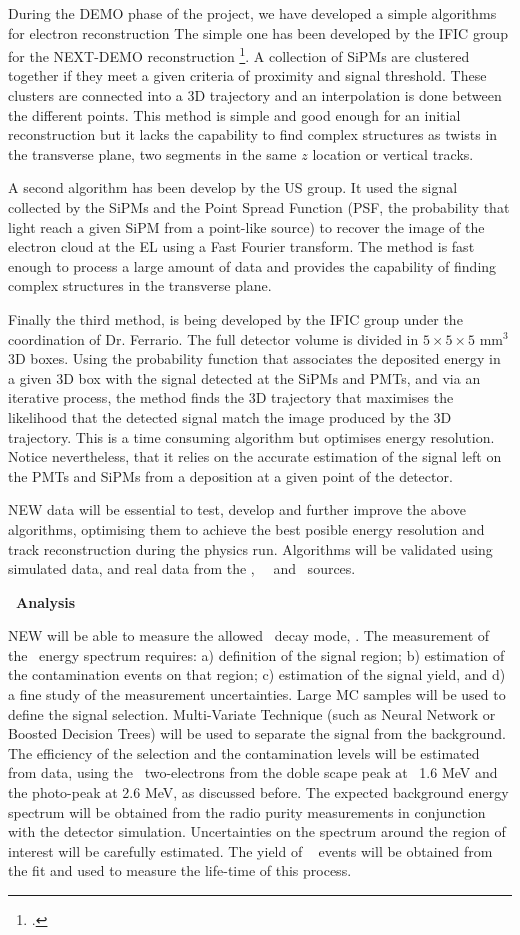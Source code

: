 During the DEMO phase of the project, we have developed a simple algorithms for electron reconstruction 
The simple one has been developed by the IFIC group for the NEXT-DEMO reconstruction \footcite{Alvarez:2012nd}. A collection of SiPMs are clustered together if they meet a given criteria of proximity and signal threshold. These clusters are connected into a 3D trajectory and an interpolation is done between the different points. This method is simple and good enough for an initial reconstruction but it lacks the capability to find complex structures as twists in the transverse plane, two segments in the same $z$ location or vertical tracks.
 
A second algorithm has been develop by the US group. It used the signal collected by the SiPMs and the Point Spread Function (PSF, the probability that light reach a given SiPM from a point-like source) to recover the image of the electron cloud at the EL using a Fast Fourier transform. The method is fast enough to process a large amount of data and provides the capability of finding complex structures in the transverse plane. 

Finally the third method, is being developed by the IFIC group under the coordination of Dr. Ferrario. The full detector volume is divided in $5\times5\times5$ mm$^3$ 3D boxes. Using the probability function that associates the deposited energy in a given 3D box with the signal detected at the SiPMs and PMTs, and via an iterative process, the method finds the 3D trajectory that maximises the likelihood that the detected signal match the image produced by the 3D trajectory. This is a time consuming algorithm but optimises energy resolution. Notice nevertheless, that it relies on the accurate estimation of the signal left on the PMTs and SiPMs from a deposition at a given point of the detector. 

NEW data will be essential to test, develop and further improve the above algorithms, optimising them to achieve the best posible energy resolution and track reconstruction during the physics run. Algorithms will be validated using simulated data, and real data from the \NA,  ~\CS ~and \Tl ~sources. 

{\bf \bb ~Analysis}

NEW will be able to measure the allowed \bb\ decay mode, \bbtnu. The measurement of the \bbtnu\ energy spectrum requires: a) definition of the signal region; b) estimation of the contamination events on that region; c) estimation of the signal yield, and d) a fine study of the measurement uncertainties.
Large MC samples will be used to define the signal selection. Multi-Variate Technique (such as Neural Network or Boosted Decision Trees) will be used to separate the signal from the background.
The efficiency of the selection and the contamination levels will be estimated from data, using the \Tl ~two-electrons from the doble scape peak at ~1.6 MeV and the photo-peak at 2.6 MeV, as discussed before. The expected background energy spectrum will be obtained from the radio purity measurements in conjunction with the detector simulation. Uncertainties on the spectrum around the region of interest will be carefully estimated.
The yield of \bb~ events will be obtained from the fit and used to measure the life-time of this process. 

